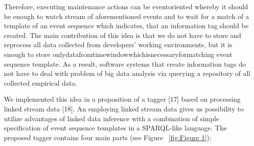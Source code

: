 \documentclass[18px,a4, conference]{IEEEtran}
\begin{document}
 Therefore, executing maintenance actions can be eventoriented whereby it should be enough to watch stream of aforementioned events and to wait for a match of a template of an event sequence which indicates, that an information tag should be created. The main contribution of this idea is that we do not have to store and reprocess all data collected from developers’ working environments, but it is enough to store onlydatafromtimewindowwhichisnecessaryformatching event sequence template. As a result, software systems that create information tags do not have to deal with problem of big data analysis via querying a repository of all collected empirical data.

 We implemented this idea in a proposition of a tagger [17] based on processing linked stream data [18]. An employing linked stream data gives us possibility to utilize advantages of linked data inference with a combination of simple speciﬁcation of event sequence templates in a SPARQL-like language. The proposed tagger contains four main parts (see Figure ~\ref{fig:Figure 1}):
\end{document}
